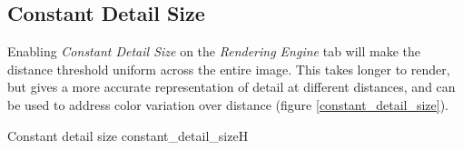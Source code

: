 \clearpage

\subsection{Constant Detail Size}

Enabling \emph{Constant Detail Size} on the \emph{Rendering Engine} tab will make the distance threshold uniform across the entire image. This takes longer to render, but gives a more accurate representation of detail at different distances, and can be used to address color variation over distance (figure \ref{constant_detail_size}).

{Constant detail size}
{constant_detail_size}{H}
